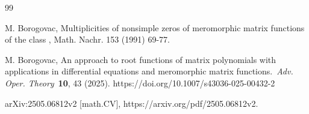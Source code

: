 \documentclass[11pt, reqno]{amsart}
\makeatletter
\theoremstyle{plain}
\theoremstyle{remark}
\numberwithin{equation}{section}
\newcounter{mathrecordid}
\newcommand{\mathboxbegin}[1]{%
  \stepcounter{mathrecordid}%
  \immediate\write\mathrecords{\themathrecordid,#1}%
  \special{pdf:bann << /Type /Annot /Subtype /Link /Border [0 0 0]
    /MathBoxID \themathrecordid /F 2
    /A << /S /URI /URI (urn:mathbox:\themathrecordid) >> >>}}
\newcommand{\mathboxinlineplain}[1]{$#1$}
\newcommand{\mathboxinline}[1]{%
  $\mathboxbegin{inline}#1\special{pdf:eann}$}
\newcommand{\recordmath}{%
  \ifmeasuring@\expandafter\mathboxinlineplain
  \else\expandafter\mathboxinline\fi}
\makeatother
\begin{document}
\begin{thebibliography}{99}







 M. Borogovac, Multiplicities of nonsimple zeros of meromorphic matrix functions of the class \recordmath{N_{\kappa}^{n\times n}}, Math. Nachr. 153 (1991) 69-77.



 M. Borogovac, An approach to root functions of matrix polynomials with applications in differential equations and meromorphic matrix functions.~\textit{Adv. Oper. Theory}~\textbf{10}, 43 (2025). https://doi.org/10.1007/s43036-025-00432-2

arXiv:2505.06812v2 [math.CV], https://arxiv.org/pdf/2505.06812v2.


\end{thebibliography}
\end{document}
